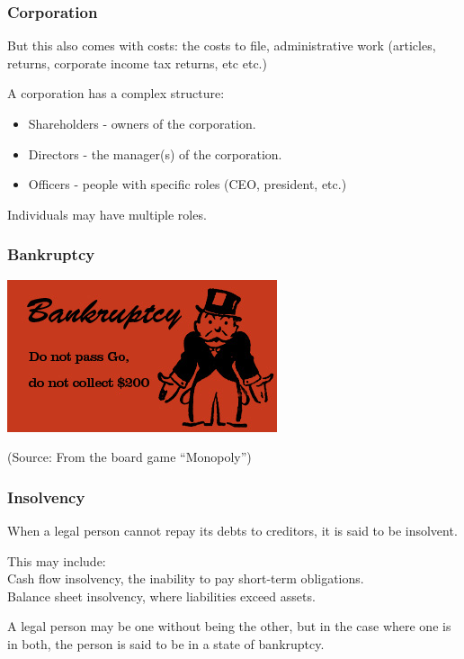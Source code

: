 \begin{frame}
\frametitle{Corporation}

But this also comes with costs: the costs to file, administrative work (articles, returns, corporate income tax returns, etc etc.)

A corporation has a complex structure:
\begin{itemize}
	\item Shareholders - owners of the corporation.
	\item Directors - the manager(s) of the corporation.
	\item Officers - people with specific roles (CEO, president, etc.)
\end{itemize}

Individuals may have multiple roles.

\end{frame}



\begin{frame}
\frametitle{Bankruptcy}

\begin{center}
	\includegraphics{images/Bankruptcy_monopoly.jpg}
\end{center}

(Source: From the board game ``Monopoly'')

\end{frame}



\begin{frame}
\frametitle{Insolvency}

When a legal person cannot repay its debts to creditors, it is said to be insolvent.

This may include:\\
\quad \alert{Cash flow insolvency}, the inability to pay short-term obligations.\\
\quad \alert{Balance sheet insolvency}, where liabilities exceed assets.
	
	A legal person may be one without being the other, but in the case where one is in both, the person is said to be in a state of bankruptcy.

\end{frame}

